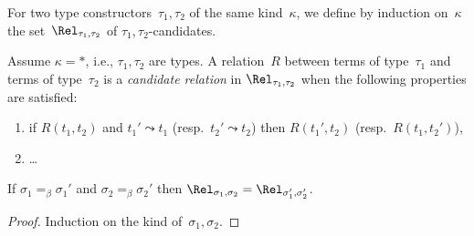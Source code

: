 \begin{definition}\label{def_param_candidate}\normalfont
  For two type constructors~$\tau_1,\tau_2$ of the same kind~$\kappa$,
  we define by induction on~$\kappa$ the set~$\Rel_{\tau_1,\tau_2}$ of
  $\tau_1,\tau_2$-candidates.

  Assume $\kappa=*$, i.e., $\tau_1,\tau_2$ are types. A relation~$R$
  between terms of type~$\tau_1$ and terms of type~$\tau_2$ is a
  \emph{candidate relation} in $\Rel_{\tau_1,\tau_2}$ when the
  following properties are satisfied:
  \begin{enumerate}
  \item if $R(t_1,t_2)$ and $t_1' \leadsto t_1$ (resp.~$t_2' \leadsto
    t_2$) then $R(t_1',t_2)$ (resp.~$R(t_1,t_2')$),
  \item \ldots
  \end{enumerate}
\end{definition}

\begin{lemma}\label{lem_beta_param_candidate}
  If $\sigma_1 =_\beta \sigma_1'$ and $\sigma_2 =_\beta \sigma_2'$
  then $\Rel_{\sigma_1,\sigma_2} = \Rel_{\sigma_1',\sigma_2'}$.
\end{lemma}

\begin{proof}
  Induction on the kind of~$\sigma_1,\sigma_2$.
\end{proof}

